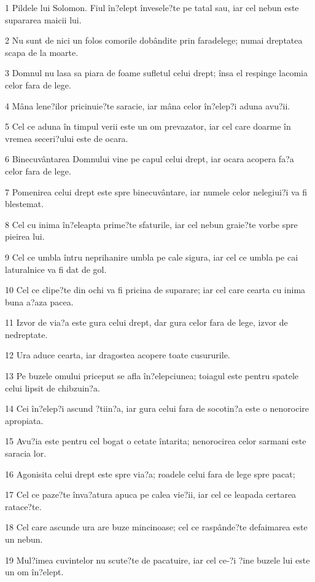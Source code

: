 \par 1 Pildele lui Solomon. Fiul în?elept învesele?te pe tatal sau, iar cel nebun este supararea maicii lui.
\par 2 Nu sunt de nici un folos comorile dobândite prin faradelege; numai dreptatea scapa de la moarte.
\par 3 Domnul nu lasa sa piara de foame sufletul celui drept; însa el respinge lacomia celor fara de lege.
\par 4 Mâna lene?ilor pricinuie?te saracie, iar mâna celor în?elep?i aduna avu?ii.
\par 5 Cel ce aduna în timpul verii este un om prevazator, iar cel care doarme în vremea seceri?ului este de ocara.
\par 6 Binecuvântarea Domnului vine pe capul celui drept, iar ocara acopera fa?a celor fara de lege.
\par 7 Pomenirea celui drept este spre binecuvântare, iar numele celor nelegiui?i va fi blestemat.
\par 8 Cel cu inima în?eleapta prime?te sfaturile, iar cel nebun graie?te vorbe spre pieirea lui.
\par 9 Cel ce umbla întru neprihanire umbla pe cale sigura, iar cel ce umbla pe cai laturalnice va fi dat de gol.
\par 10 Cel ce clipe?te din ochi va fi pricina de suparare; iar cel care cearta cu inima buna a?aza pacea.
\par 11 Izvor de via?a este gura celui drept, dar gura celor fara de lege, izvor de nedreptate.
\par 12 Ura aduce cearta, iar dragostea acopere toate cusururile.
\par 13 Pe buzele omului priceput se afla în?elepciunea; toiagul este pentru spatele celui lipsit de chibzuin?a.
\par 14 Cei în?elep?i ascund ?tiin?a, iar gura celui fara de socotin?a este o nenorocire apropiata.
\par 15 Avu?ia este pentru cel bogat o cetate întarita; nenorocirea celor sarmani este saracia lor.
\par 16 Agonisita celui drept este spre via?a; roadele celui fara de lege spre pacat;
\par 17 Cel ce paze?te înva?atura apuca pe calea vie?ii, iar cel ce leapada certarea ratace?te.
\par 18 Cel care ascunde ura are buze mincinoase; cel ce raspânde?te defaimarea este un nebun.
\par 19 Mul?imea cuvintelor nu scute?te de pacatuire, iar cel ce-?i ?ine buzele lui este un om în?elept.
